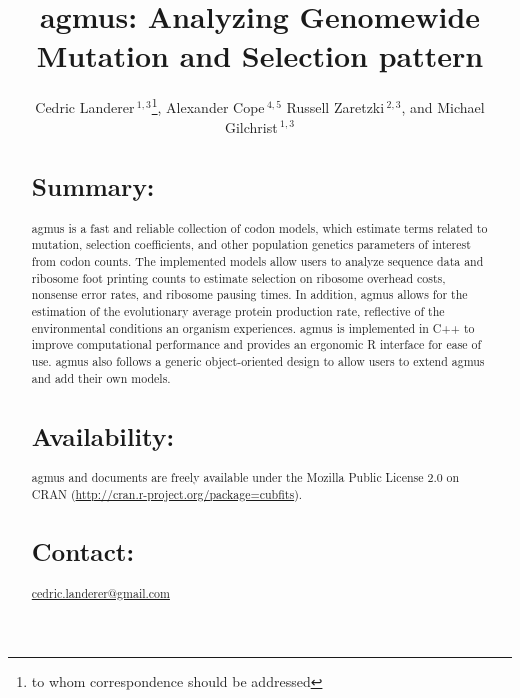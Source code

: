 \documentclass{bioinfo}
\newcommand{\pkg}[1]{{\fontseries{b}\selectfont #1}}
\newcommand{\package}{agmus } %
\begin{document}

\title[agmus]{agmus: Analyzing Genomewide Mutation and Selection pattern}
\author[
Landerer \textit{et~al}]{Cedric Landerer\,$^{1,3}$\footnote{
to whom correspondence should be addressed
},
Alexander Cope\,$^{4,5}$
Russell Zaretzki\,$^{2,3}$, and
Michael Gilchrist\,$^{1,3}$
}
\address{$^{1}$
Department of Ecology and Evolutionary Biology,
$^{2}$Department of Statistics, Operations, and Management Science, and
$^{3}$National Institute for Mathematical and Biological Synthesis,
University of Tennessee, Knoxville, TN, USA,
$^{4}$Genome Science and Technology, University of Tennessee, Knoxville, TN, USA
$^{5}$Oak Ridge National Labratory, Oak Ridge, TN, USA} 


\maketitle

\begin{abstract}

\section{Summary:}
\pkg{\package} is a fast and reliable collection of codon models, which estimate terms related to mutation, selection coefficients, and other population genetics parameters of interest from codon counts. 
The implemented models allow users to analyze sequence data and ribosome foot printing counts to estimate selection on ribosome overhead costs, nonsense error rates, and ribosome pausing times. 
In addition, \package allows for the estimation of the evolutionary average protein production rate, reflective of the environmental conditions an organism experiences. 
\package is implemented in C++ to improve computational performance and provides an ergonomic R interface for ease of use. 
\package also follows a generic object-oriented design to allow users to extend \package and add their own models.

\section{Availability:}
\pkg{\package} and documents are freely available under the Mozilla Public License 2.0
on CRAN (\url{http://cran.r-project.org/package=cubfits}).

\section{Contact:} \href{cedric.landerer@gmail.com}{cedric.landerer@gmail.com}
\end{abstract}
\end{document}
